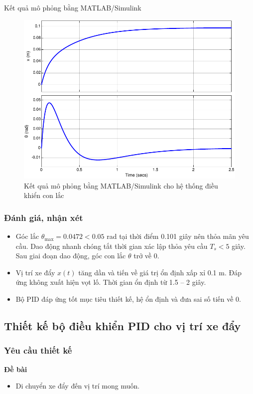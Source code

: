 \documentclass[12pt,a4paper]{article}
\begin{document}
Kết quả mô phỏng bằng MATLAB/Simulink
\begin{figure}[ht]
    \centering
    \includegraphics[width=0.645\linewidth]{MATLAB_5.pdf}
    \caption{Kết quả mô phỏng bằng MATLAB/Simulink cho hệ thống điều khiển con lắc}
\end{figure}

\subsubsection{Đánh giá, nhận xét}

\begin{itemize}
    \item Góc lắc $\theta_{\max}=0.0472 < 0.05$ rad tại thời điểm 0.101 giây nên thỏa mãn yêu cầu. Dao động nhanh chóng tắt thời gian xác lập thỏa yêu cầu $T_s<5$ giây. Sau giai đoạn dao động, góc con lắc $\theta$ trở về 0.
    \item Vị trí xe đẩy $x(t)$ tăng dần và tiến về giá trị ổn định xấp xỉ 0.1 m. Đáp ứng không xuất hiện vọt lố. Thời gian ổn định từ 1.5 -- 2 giây.
    \item Bộ PID đáp ứng tốt mục tiêu thiết kế, hệ ổn định và đưa sai số tiến về 0.
\end{itemize}


\subsection{Thiết kế bộ điều khiển PID cho vị trí xe đẩy}
\subsubsection{Yêu cầu thiết kế}
\begin{minipage}[t]{0.3\linewidth}
    \textbf{Đề bài}
\end{minipage}\begin{minipage}[t]{0.6\linewidth}
    \begin{itemize}
        \item  Di chuyển xe đẩy đến vị trí mong muốn.
    \end{itemize}
\end{minipage}
\end{document}
